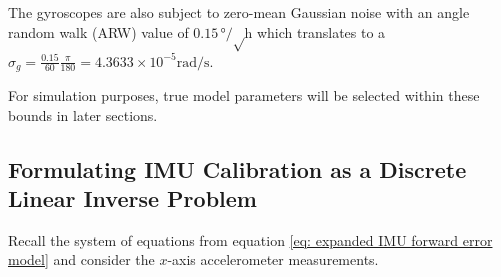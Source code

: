 The gyroscopes are also subject to zero-mean Gaussian noise with an angle random walk (ARW) value of $0.15 \unit{\degree\per\sqrt\hour}$ which translates to a $\sigma_g = \frac{0.15}{60}\frac{\pi}{180} = 4.3633 \times 10^{-5} \unit{\radian\per\second}$.

For simulation purposes, true model parameters will be selected within these bounds in later sections.


%
%
%
%
%
%


\subsection{Formulating IMU Calibration as a Discrete Linear Inverse Problem}

Recall the system of equations from equation \ref{eq: expanded IMU forward error model} and consider the $x$-axis accelerometer measurements.

